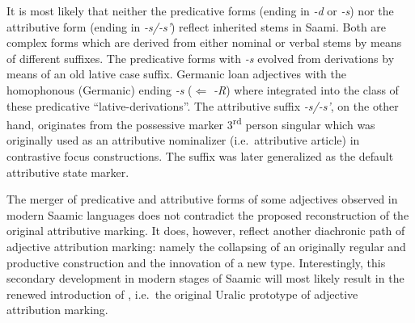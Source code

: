 {
It is most likely that neither the predicative forms (ending in \textit{-d} or \textit{-s}) nor the attributive form (ending in \textit{-s/-s'}) reflect inherited stems in Saami. Both are complex forms which are derived from either nominal or verbal stems by means of different suffixes. The predicative forms with \textit{-s} evolved from derivations by means of an old lative case suffix. Germanic loan adjectives with the homophonous (Germanic) ending \textit{-s} ($\Leftarrow$  \textit{-R}) where integrated into the class of these predicative “lative-derivations”. The attributive suffix \textit{-s/-s'}, on the other hand, originates from the possessive marker 3\textsuperscript{rd} person singular which was originally used as an attributive nominalizer (i.e.~attributive article) in contrastive focus constructions. The suffix was later generalized as the default attributive state marker.

The merger of predicative and attributive forms of some adjectives observed in modern Saamic languages does not contradict the proposed reconstruction of the original attributive marking. It does, however, reflect another diachronic path of adjective attribution marking: namely the collapsing of an originally regular and productive construction and the innovation of a new type. Interestingly, this secondary development in modern stages of Saamic will most likely result in the renewed introduction of , i.e.~the original Uralic prototype of adjective attribution marking.

}
